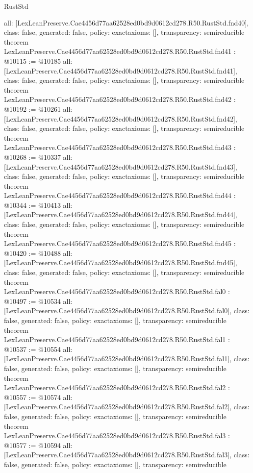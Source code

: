 \begin{lexlean}{RustStd}
\begin{coremodule}
{  all: [LexLeanPreserve.Cae4456d77aa62528ed0bd9d0612cd278.R50.RustStd.fnd40],
  class: false,
  generated: false,
  policy: exact{axioms: []},
  transparency: semireducible
}
theorem LexLeanPreserve.Cae4456d77aa62528ed0bd9d0612cd278.R50.RustStd.fnd41 : @10115 := @10185 {
  all: [LexLeanPreserve.Cae4456d77aa62528ed0bd9d0612cd278.R50.RustStd.fnd41],
  class: false,
  generated: false,
  policy: exact{axioms: []},
  transparency: semireducible
}
theorem LexLeanPreserve.Cae4456d77aa62528ed0bd9d0612cd278.R50.RustStd.fnd42 : @10192 := @10261 {
  all: [LexLeanPreserve.Cae4456d77aa62528ed0bd9d0612cd278.R50.RustStd.fnd42],
  class: false,
  generated: false,
  policy: exact{axioms: []},
  transparency: semireducible
}
theorem LexLeanPreserve.Cae4456d77aa62528ed0bd9d0612cd278.R50.RustStd.fnd43 : @10268 := @10337 {
  all: [LexLeanPreserve.Cae4456d77aa62528ed0bd9d0612cd278.R50.RustStd.fnd43],
  class: false,
  generated: false,
  policy: exact{axioms: []},
  transparency: semireducible
}
theorem LexLeanPreserve.Cae4456d77aa62528ed0bd9d0612cd278.R50.RustStd.fnd44 : @10344 := @10413 {
  all: [LexLeanPreserve.Cae4456d77aa62528ed0bd9d0612cd278.R50.RustStd.fnd44],
  class: false,
  generated: false,
  policy: exact{axioms: []},
  transparency: semireducible
}
theorem LexLeanPreserve.Cae4456d77aa62528ed0bd9d0612cd278.R50.RustStd.fnd45 : @10420 := @10488 {
  all: [LexLeanPreserve.Cae4456d77aa62528ed0bd9d0612cd278.R50.RustStd.fnd45],
  class: false,
  generated: false,
  policy: exact{axioms: []},
  transparency: semireducible
}
theorem LexLeanPreserve.Cae4456d77aa62528ed0bd9d0612cd278.R50.RustStd.fal0 : @10497 := @10534 {
  all: [LexLeanPreserve.Cae4456d77aa62528ed0bd9d0612cd278.R50.RustStd.fal0],
  class: false,
  generated: false,
  policy: exact{axioms: []},
  transparency: semireducible
}
theorem LexLeanPreserve.Cae4456d77aa62528ed0bd9d0612cd278.R50.RustStd.fal1 : @10537 := @10554 {
  all: [LexLeanPreserve.Cae4456d77aa62528ed0bd9d0612cd278.R50.RustStd.fal1],
  class: false,
  generated: false,
  policy: exact{axioms: []},
  transparency: semireducible
}
theorem LexLeanPreserve.Cae4456d77aa62528ed0bd9d0612cd278.R50.RustStd.fal2 : @10557 := @10574 {
  all: [LexLeanPreserve.Cae4456d77aa62528ed0bd9d0612cd278.R50.RustStd.fal2],
  class: false,
  generated: false,
  policy: exact{axioms: []},
  transparency: semireducible
}
theorem LexLeanPreserve.Cae4456d77aa62528ed0bd9d0612cd278.R50.RustStd.fal3 : @10577 := @10594 {
  all: [LexLeanPreserve.Cae4456d77aa62528ed0bd9d0612cd278.R50.RustStd.fal3],
  class: false,
  generated: false,
  policy: exact{axioms: []},
  transparency: semireducible
}
\end{coremodule}
\end{lexlean}
